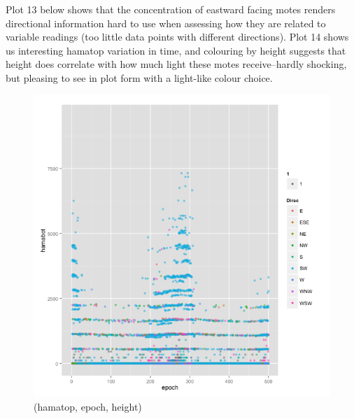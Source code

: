 \documentclass[english]{article}\usepackage[]{graphicx}\usepackage[]{color}
\begin{document}
Plot 13 below shows that the concentration of eastward facing motes renders directional information hard to use when assessing how they are related to variable readings (too little data points with different directions).  Plot 14 shows us interesting hamatop variation in time, and colouring by height suggests that height does correlate with how much light these motes receive--hardly shocking, but pleasing to see in plot form with a light-like colour choice.   

\begin{figure}[H]
\centering
\begin{minipage}{.50\textwidth}
\centering
\includegraphics[width=\linewidth]{hamabotdirec}
\caption{(hamatop, epoch, height)}
\end{minipage}\hfill
\begin{minipage}{.50\textwidth}
\centering

\end{minipage}
\end{figure}
\end{document}
